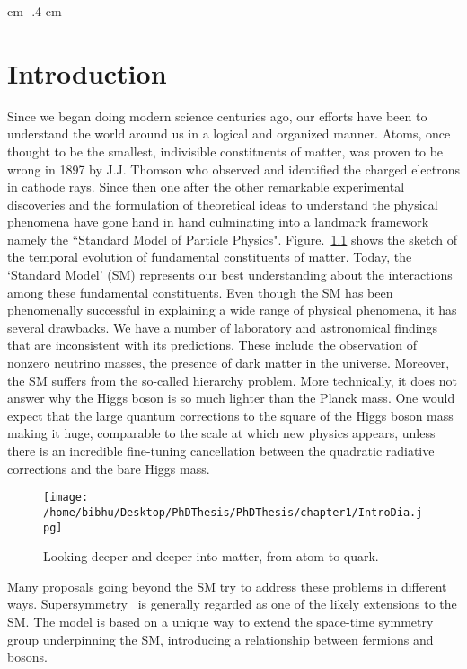\setcounter{section}{0}
\setcounter{subsection}{0}
\setcounter{subsubsection}{0}
\setcounter{equation}{0}
\setcounter{page}{1} 
 cm 
\evensidemargin -.4 cm
\setlength{\textwidth}{152.4 mm}
\chapter{Introduction \label{Introduction}}

Since we began doing modern science centuries ago, our efforts have been to understand the world around us in a logical and organized manner. Atoms, once thought to be the smallest, indivisible constituents of matter, was proven to be wrong in 1897 by J.J. Thomson who observed and identified the charged electrons in cathode rays. Since then one after the other remarkable experimental discoveries and the formulation of theoretical ideas to understand the physical phenomena have gone hand in hand culminating into a landmark framework namely the  ``Standard Model of Particle Physics". Figure.~\ref{fig:ParticleIntro} shows the sketch of the temporal evolution of fundamental constituents of matter. Today, the `Standard Model' (SM) represents our best understanding about the interactions among these fundamental constituents. Even though the SM has been phenomenally successful in explaining a wide range of physical phenomena, it has several drawbacks. We have a number of laboratory and astronomical findings that are inconsistent with its predictions. These  include the observation of nonzero neutrino masses, the presence of dark matter in the universe. Moreover, the SM suffers from the so-called hierarchy problem. More technically, it does not answer why the Higgs boson is so much lighter than the Planck mass. One would expect that the large quantum corrections to the square of the Higgs boson mass making it huge, comparable to the scale at which new physics appears, unless there is an incredible fine-tuning cancellation between the quadratic radiative corrections and the bare Higgs mass. 

\begin{figure}[h]
    \centering
    \texttt{[image: /home/bibhu/Desktop/PhDThesis/PhDThesis/chapter1/IntroDia.jpg]}
    \caption{ \small Looking deeper and deeper into matter, from atom to quark.}
    \label{fig:ParticleIntro}
\end{figure}

Many proposals going beyond the SM try to address these problems in different ways.  Supersymmetry~\cite{SUSYtheo} is generally regarded as one of the likely extensions to the SM. The model is based on a unique way to extend the space-time symmetry group
underpinning the SM, introducing a relationship between fermions and bosons.
 
